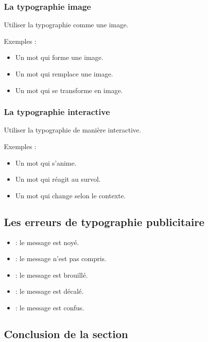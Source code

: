 \subsubsection{La typographie image}

Utiliser la typographie comme une image.

Exemples :
\begin{itemize}
    \item Un mot qui forme une image.
    \item Un mot qui remplace une image.
    \item Un mot qui se transforme en image.
\end{itemize}

\subsubsection{La typographie interactive}

Utiliser la typographie de manière interactive.

Exemples :
\begin{itemize}
    \item Un mot qui s'anime.
    \item Un mot qui réagit au survol.
    \item Un mot qui change selon le contexte.
\end{itemize}

\subsection{Les erreurs de typographie publicitaire}

\begin{itemize}
    \item {} : le message est noyé.
    \item {} : le message n'est pas compris.
    \item {} : le message est brouillé.
    \item {} : le message est décalé.
    \item {} : le message est confus.
\end{itemize}

\subsection*{Conclusion de la section}

